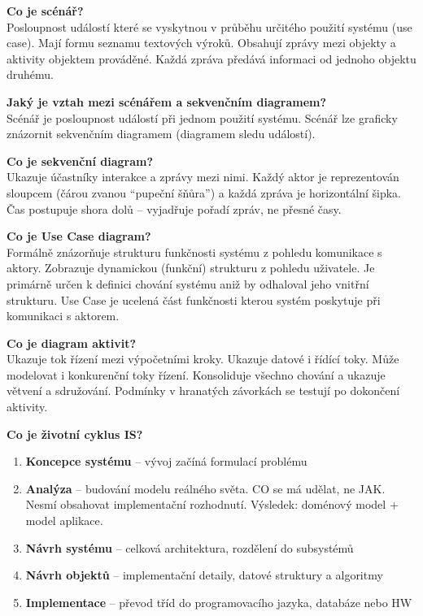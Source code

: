 \documentclass[12pt, a4paper]{article}
\begin{document}
\textbf{Co je scénář?}\\
Posloupnost událostí které se vyskytnou v průběhu určitého použití systému (use case). Mají formu seznamu textových výroků. Obsahují zprávy mezi objekty a aktivity objektem prováděné. Každá zpráva předává informaci od jednoho objektu druhému.

\textbf{Jaký je vztah mezi scénářem a sekvenčním diagramem?}\\
Scénář je posloupnost událostí při jednom použití systému. Scénář lze graficky znázornit sekvenčním diagramem (diagramem sledu událostí).

\textbf{Co je sekvenční diagram?}\\
Ukazuje účastníky interakce a zprávy mezi nimi. Každý aktor je reprezentován sloupcem (čárou zvanou ``pupeční šňůra'') a každá zpráva je horizontální šipka. Čas postupuje shora dolů -- vyjadřuje pořadí zpráv, ne přesné časy.

\textbf{Co je Use Case diagram?}\\
Formálně znázorňuje strukturu funkčnosti systému z pohledu komunikace s aktory. Zobrazuje dynamickou (funkční) strukturu z pohledu uživatele. Je primárně určen k definici chování systému aniž by odhaloval jeho vnitřní strukturu. Use Case je ucelená část funkčnosti kterou systém poskytuje při komunikaci s aktorem.

\textbf{Co je diagram aktivit?}\\
Ukazuje tok řízení mezi výpočetními kroky. Ukazuje datové i řídící toky. Může modelovat i konkurenční toky řízení. Konsoliduje všechno chování a ukazuje větvení a sdružování. Podmínky v hranatých závorkách se testují po dokončení aktivity.

\textbf{Co je životní cyklus IS?}
\begin{enumerate}
  \item \textbf{Koncepce systému} -- vývoj začíná formulací problému
  \item \textbf{Analýza} -- budování modelu reálného světa. CO se má udělat, ne JAK. Nesmí obsahovat implementační rozhodnutí. Výsledek: doménový model + model aplikace.
  \item \textbf{Návrh systému} -- celková architektura, rozdělení do subsystémů
  \item \textbf{Návrh objektů} -- implementační detaily, datové struktury a algoritmy
  \item \textbf{Implementace} -- převod tříd do programovacího jazyka, databáze nebo HW
\end{enumerate}
\end{document}
